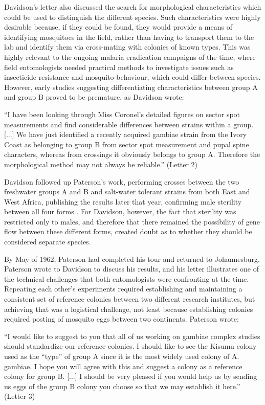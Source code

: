 \documentclass[a4paper,11pt,abstracton,hidelinks]{scrartcl}
\begin{document}
Davidson's letter also discussed the search for morphological characteristics which could be used to distinguish the different species.
%
Such characteristics were highly desirable because, if they could be found, they would provide a means of identifying mosquitoes in the field, rather than having to transport them to the lab and identify them via cross-mating with colonies of known types.
%
This was highly relevant to the ongoing malaria eradication campaigns of the time, where field entomologists needed practical methods to investigate issues such as insecticide resistance and mosquito behaviour, which could differ between species.
%
However, early studies suggesting differentiating characteristics between group A and group B \citep{Coronel1962} proved to be premature, as Davidson wrote:
\begin{displayquote}
``I have been looking through Miss Coronel's detailed figures on sector spot measurements and find considerable differences between strains within a group.
%
[...] We have just identified a recently acquired gambiae strain from the Ivory Coast as belonging to group B from sector spot measurement and pupal spine characters, whereas from crossings it obviously belongs to group A.
%
Therefore the morphological method may not always be reliable.'' (Letter 2)
\end{displayquote}


Davidson followed up Paterson's work, performing crosses between the two freshwater groups A and B and salt-water tolerant strains from both East and West Africa, publishing the results later that year, confirming male sterility between all four forms \citep{Davidson1962b}.
%
For Davidson, however, the fact that sterility was restricted only to males, and therefore that there remained the possibility of gene flow between these different forms, created doubt as to whether they should be considered separate species.


By May of 1962, Paterson had completed his tour and returned to Johannesburg.
%
Paterson wrote to Davidson to discuss his results, and his letter illustrates one of the technical challenges that both entomologists were confronting at the time.
%
Repeating each other's experiments required establishing and maintaining a consistent set of reference colonies between two different research institutes, but achieving that was a logistical challenge, not least because establishing colonies required posting of mosquito eggs between two continents.
%
Paterson wrote:
\begin{displayquote}
``I would like to suggest to you that all of us working on gambiae complex studies should standardize our reference colonies.
%
I should like to see the Kisumu colony used as the ``type'' of group A since it is the most widely used colony of A. gambiae.
%
I hope you will agree with this and suggest a colony as a reference colony for group B. 
%
[...] I should be very pleased if you would help us by sending us eggs of the group B colony you choose so that we may establish it here.'' (Letter 3)
\end{displayquote}
\end{document}
